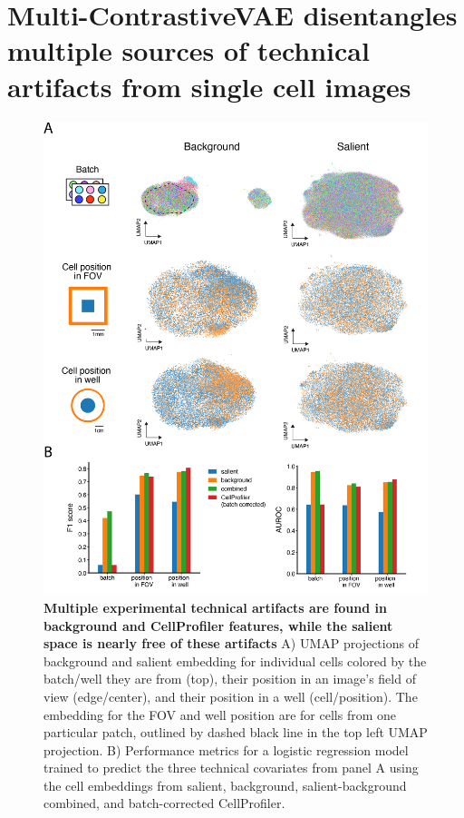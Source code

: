 \documentclass{article}
\begin{document}
\section*{Multi-ContrastiveVAE disentangles multiple sources of technical artifacts from single cell images
}

\begin{figure}[h!]
    \centering
    \includegraphics[width=\textwidth]{figure/figure_2.png}
    \caption{\textbf{Multiple experimental technical artifacts are found in background and CellProfiler features, while the salient space is nearly free of these artifacts}
    A) UMAP projections of background and salient embedding for individual cells colored by the batch/well they are from (top), their position in an image's field of view (edge/center), and their position in a well (cell/position). The embedding for the FOV and well position are for cells from one particular patch, outlined by dashed black line in the top left UMAP projection.
    B) Performance metrics for a logistic regression model trained to predict the three technical covariates from panel A using the cell embeddings from salient, background, salient-background combined, and batch-corrected CellProfiler.}
    \label{fig:artifact}
\end{figure}
\end{document}
